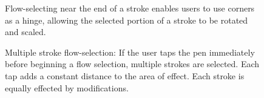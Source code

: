 \documentclass{egpubl}
\begin{document}
\begin{figure}
  \centering {}
\hspace{0.4cm} 
  \caption{Flow-selecting near the end of a stroke enables users to
    use corners as a hinge, allowing the selected portion of a stroke
    to be rotated and scaled.}
  \label{fig:fs-hinge}
\end{figure}


\begin{figure}
  \centering {}
\caption{Multiple stroke flow-selection: If the user taps the pen
  immediately before beginning a flow selection, multiple strokes are
  selected. Each tap adds a constant distance to the area of
  effect. Each stroke is equally effected by modifications.}
  \label{fig:fs-multi}
\end{figure}
\end{document}
